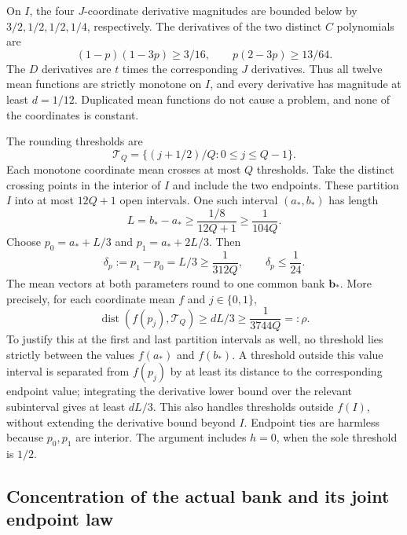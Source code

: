 On $I$, the four $J$-coordinate derivative magnitudes are bounded below
by $3/2,1/2,1/2,1/4$, respectively.  The derivatives of the two
distinct $C$ polynomials are
\[
 (1-p)(1-3p)\ge3/16,\qquad
 p(2-3p)\ge13/64.
\]
The $D$ derivatives are $t$ times the corresponding $J$ derivatives.
Thus all twelve mean functions are strictly monotone on $I$, and every
derivative has magnitude at least $d=1/12$.  Duplicated mean functions
do not cause a problem, and none of the coordinates is constant.

The rounding thresholds are
\[
 \mathcal T_Q=\{(j+1/2)/Q:0\le j\le Q-1\}.
\]
Each monotone coordinate mean crosses at most $Q$ thresholds.
Take the distinct crossing points in the interior of $I$ and include
the two endpoints.  These partition $I$ into at most $12Q+1$ open
intervals.  One such interval $(a_*,b_*)$ has length
\begin{equation}\label{eq:p-cell-length}
 L=b_*-a_*\ge\frac{1/8}{12Q+1}\ge\frac1{104Q}.
\end{equation}
Choose $p_0=a_*+L/3$ and $p_1=a_*+2L/3$.  Then
\begin{equation}\label{eq:p-cell-separation}
 \delta_p:=p_1-p_0=L/3\ge\frac1{312Q},\qquad
 \delta_p\le\frac1{24}.
\end{equation}
The mean vectors at both parameters round to one common bank
$\mathbf b_*$.  More precisely, for each coordinate mean $f$ and
$j\in\{0,1\}$,
\begin{equation}\label{eq:p-cell-margin}
 \operatorname{dist}(f(p_j),\mathcal T_Q)
 \ge dL/3\ge\frac1{3744Q}=:\rho.
\end{equation}
To justify this at the first and last partition intervals as well,
no threshold lies strictly between the values $f(a_*)$ and $f(b_*)$.
A threshold outside this value interval is separated from $f(p_j)$
by at least its distance to the corresponding endpoint value; integrating
the derivative lower bound over the relevant subinterval gives at
least $dL/3$.  This also handles thresholds outside $f(I)$, without
extending the derivative bound beyond $I$.  Endpoint ties are harmless
because $p_0,p_1$ are interior.  The argument includes $h=0$, when
the sole threshold is $1/2$.

\subsection{Concentration of the actual bank and its joint endpoint law}

